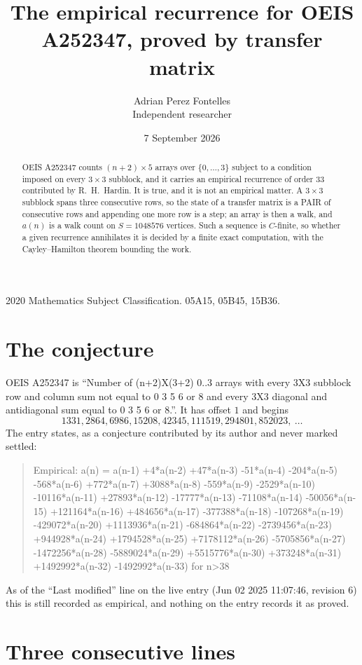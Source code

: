 \documentclass[11pt,a4paper]{article}
\title{The empirical recurrence for OEIS A252347, proved by transfer matrix}
\author{Adrian Perez Fontelles\\ \small Independent researcher}
\date{7 September 2026}
\theoremstyle{plain}
\theoremstyle{definition}
\begin{document}
\maketitle

\begin{abstract}
OEIS A252347 counts $(n+2)\times5$ arrays over $\{0,\dots,3\}$ subject to a condition imposed on
every $3\times3$ subblock, and it carries an empirical recurrence of order $33$
contributed by R.~H.~Hardin. It is true, and it is not an empirical matter. A $3\times3$
subblock spans three consecutive rows, so the state of a transfer matrix is a PAIR of
consecutive rows and appending one more row is a step; an array is then a walk, and
$a(n)$ is a walk count on $S=1048576$ vertices. Such a sequence is $C$-finite, so whether a given
recurrence annihilates it is decided by a finite exact computation, with the Cayley--Hamilton
theorem bounding the work.
\end{abstract}

\noindent\small 2020 Mathematics Subject Classification. 05A15, 05B45, 15B36.\normalsize

\section{The conjecture}

OEIS A252347 is ``Number of (n+2)X(3+2) 0..3 arrays with every 3X3 subblock row and column sum not equal to 0 3 5 6 or 8 and every 3X3 diagonal and antidiagonal sum equal to 0 3 5 6 or 8.''. It has offset $1$ and begins
\[
1331, 2864, 6986, 15208, 42345, 111519, 294801, 852023,\ \dots
\]
The entry states, as a conjecture contributed by its author and never marked settled:
\begin{quote}
Empirical: a(n) = a(n-1) +4*a(n-2) +47*a(n-3) -51*a(n-4) -204*a(n-5) -568*a(n-6) +772*a(n-7) +3088*a(n-8) -559*a(n-9) -2529*a(n-10) -10116*a(n-11) +27893*a(n-12) -17777*a(n-13) -71108*a(n-14) -50056*a(n-15) +121164*a(n-16) +484656*a(n-17) -377388*a(n-18) -107268*a(n-19) -429072*a(n-20) +1113936*a(n-21) -684864*a(n-22) -2739456*a(n-23) +944928*a(n-24) +1794528*a(n-25) +7178112*a(n-26) -5705856*a(n-27) -1472256*a(n-28) -5889024*a(n-29) +5515776*a(n-30) +373248*a(n-31) +1492992*a(n-32) -1492992*a(n-33) for n>38
\end{quote}
As of the ``Last modified'' line on the live entry (Jun 02 2025 11:07:46, revision 6) this is still
recorded as empirical, and nothing on the entry records it as proved.

\section{Three consecutive lines}
\end{document}

